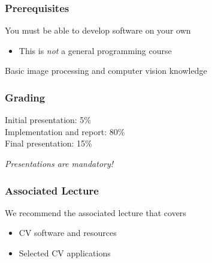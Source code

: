 \documentclass[xetex,professionalfont]{beamer}
\begin{document}

\begin{frame}
\frametitle{Prerequisites}

You must be able to develop software on your own
\begin{itemize}
	\item This is \emph{not} a general programming course
\end{itemize}

\bigskip
Basic image processing and computer vision knowledge

\end{frame}


\begin{frame}
\frametitle{Grading}

Initial presentation: 5\% \\
Implementation and report: 80\% \\
Final presentation: 15\%

\bigskip
\emph{Presentations are mandatory!}

\end{frame}


\begin{frame}
\frametitle{Associated Lecture}

We recommend the associated lecture that covers
\begin{itemize}
	\item CV software and resources
	\item Selected CV applications
\end{itemize}

\end{frame}
\end{document}

